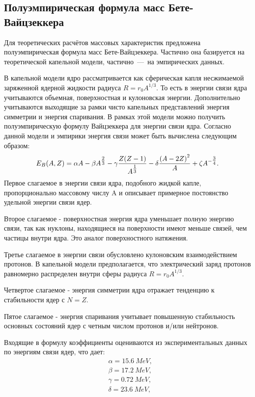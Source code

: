 \documentclass[12pt]{article}
\begin{document}
\subsection{Полуэмпирическая формула масс Бете\--Вайцзеккера}
Для теоретических расчётов массовых характеристик предложена полуэмпирическая формула масс Бете\--Вайцзеккера. Частично она базируется на теоретической капельной модели, частично~\----~на эмпирических данных.
\par
В капельной модели ядро рассматривается как сферическая капля несжимаемой заряженной ядерной жидкости радиуса $R = r_0 A^{{1}/{3}}$. То есть в энергии связи ядра учитываются объемная, поверхностная и кулоновская энергии. Дополнительно учитываются выходящие за рамки чисто капельных представлений энергия симметрии и энергия спаривания. В рамках этой модели можно получить полуэмпирическую формулу Вайцзеккера для энергии связи ядра. Согласно данной модели и эмпирики энергия связи может быть вычислена следующим образом:
\begin{equation}\label{bv}
E_B \qty(A,Z) = \alpha A - \beta A^{\tfrac{2}{3}}- \gamma \dfrac{Z\qty(Z-1)}{A^{\tfrac{1}{3}}} - \delta \dfrac{\qty(A - 2Z)^2}{A} + \zeta A^{-\tfrac{3}{4}}.
\end{equation}
Первое слагаемое в энергии связи ядра, подобного жидкой капле,  пропорционально массовому числу A  и описывает примерное постоянство удельной энергии связи ядер.
\par
Второе слагаемое - поверхностная энергия ядра уменьшает полную энергию связи, так как нуклоны, находящиеся на поверхности имеют меньше связей, чем частицы внутри ядра. Это аналог поверхностного натяжения.
\par
Третье слагаемое в энергии связи обусловлено кулоновским взаимодействием протонов. В капельной модели предполагается, что электрический заряд протонов равномерно распределен внутри сферы радиуса $R = r_0 A^{{1}/{3}}$.
\par
Четвертое слагаемое - энергия симметрии ядра отражает тенденцию к стабильности ядер с $N = Z$.
\par
Пятое слагаемое - энергия спаривания учитывает повышенную стабильность основных состояний ядер с четным числом протонов и/или нейтронов. 
\par 
Входящие в формулу коэффициенты оцениваются из экспериментальных данных по энергиям связи ядер, что дает:
\begin{equation*}
\begin{split}
&\alpha = 15.6\ MeV,\\
&\beta = 17.2\ MeV,\\
&\gamma = 0.72\ MeV,\\
&\delta = 23.6\ MeV,
\end{split}
\end{equation*}
\end{document}
